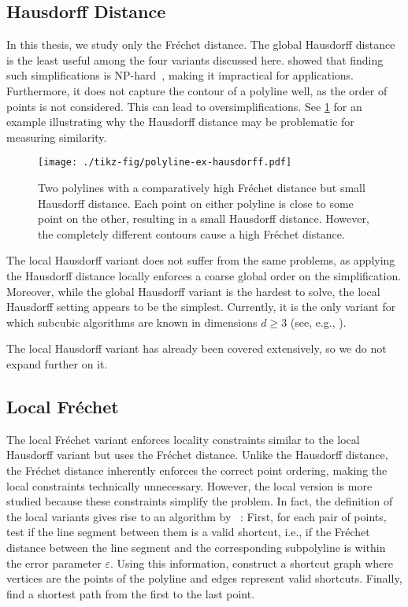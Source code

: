 \subsection{Hausdorff Distance}
In this thesis, we study only the Fréchet distance. The global Hausdorff distance is the least useful among the four variants discussed here. \citeauthor{on_optimal_polyline_simplification_using_the_hausdorff_and_frechet_distance} showed that finding such simplifications is NP-hard~\cite{on_optimal_polyline_simplification_using_the_hausdorff_and_frechet_distance}, making it impractical for applications. Furthermore, it does not capture the contour of a polyline well, as the order of points is not considered. This can lead to oversimplifications. See \cref{fig:polyline-ex-hausdorff} for an example illustrating why the Hausdorff distance may be problematic for measuring similarity.

\begin{figure}[b]
  \centering
  \texttt{[image: ./tikz-fig/polyline-ex-hausdorff.pdf]}
  \caption{Two polylines with a comparatively high Fréchet distance but small Hausdorff distance. Each point on either polyline is close to some point on the other, resulting in a small Hausdorff distance. However, the completely different contours cause a high Fréchet distance.}
  \label{fig:polyline-ex-hausdorff}
\end{figure}

The local Hausdorff variant does not suffer from the same problems, as applying the Hausdorff distance locally enforces a coarse global order on the simplification. Moreover, while the global Hausdorff variant is the hardest to solve, the local Hausdorff setting appears to be the simplest. Currently, it is the only variant for which subcubic algorithms are known in dimensions \(d \geq 3\) (see, e.g., \cite{efficiently_approximating_higher_dim}).

The local Hausdorff variant has already been covered extensively, so we do not expand further on it.

\subsection{Local Fréchet}
The local Fréchet variant enforces locality constraints similar to the local Hausdorff variant but uses the Fréchet distance. Unlike the Hausdorff distance, the Fréchet distance inherently enforces the correct point ordering, making the local constraints technically unnecessary. However, the local version is more studied because these constraints simplify the problem. In fact, the definition of the local variants gives rise to an algorithm by \citeauthor{computational_geometric_methods_for_polygonal_approximations_of_a_curve}~\cite{computational_geometric_methods_for_polygonal_approximations_of_a_curve}: First, for each pair of points, test if the line segment between them is a valid shortcut, i.e., if the Fréchet distance between the line segment and the corresponding subpolyline is within the error parameter \(\varepsilon\). Using this information, construct a shortcut graph where vertices are the points of the polyline and edges represent valid shortcuts. Finally, find a shortest path from the first to the last point.

